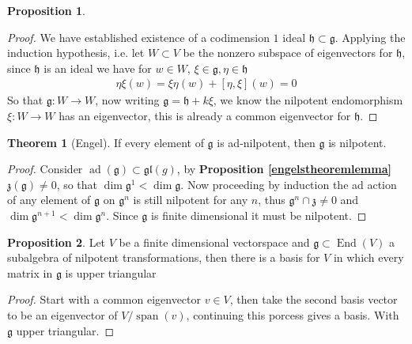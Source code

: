 \documentclass[10.5pt]{article}
\theoremstyle{definition}
\newtheorem{proposition}{Proposition}
\newtheorem{theorem}{Theorem}
\numberwithin{example}{subsection}
\numberwithin{proposition}{subsection}
\numberwithin{pb}{subsection}
\begin{document}
\begin{proposition}
\begin{proof}
                We have established existence of a codimension \(1\) ideal \(\mathfrak{h} \subset \mathfrak{g}\). Applying the induction hypothesis, i.e. let \(W \subset V\) be the nonzero subspace of eigenvectors for \(\mathfrak{h}\), since \(\mathfrak{h}\) is an ideal we have for \(w \in W\), \(\xi \in \mathfrak{g}, \eta \in \mathfrak{h}\)
                \begin{align}
                    \eta\xi(w) = \xi \eta (w) + [\eta,\xi](w) = 0
                \end{align}
                So that \(\mathfrak{g}: W \to W\), now writing \(\mathfrak{g} = \mathfrak{h} + k\xi\), we know the nilpotent endomorphism \(\xi: W \to W\) has an eigenvector,  this is already a common eigenvector for \(\mathfrak{h}\).
            \end{proof}
        \end{proposition}

        \begin{theorem}[Engel]\label{engel}
            If every element of \(\mathfrak{g}\) is ad-nilpotent, then \(\mathfrak{g}\) is nilpotent.

            \begin{proof}
                Consider \(\operatorname{ad}(\mathfrak{g}) \subset \mathfrak{gl}(g)\), by \textbf{Proposition \ref{engelstheoremlemma}} \(\mathfrak{z}(\mathfrak{g}) \neq 0\), so that \(\dim \mathfrak{g}^1 < \dim \mathfrak{g}\). Now proceeding by induction the ad action of any element of \(\mathfrak{g}\) on \(\mathfrak{g}^n\) is still nilpotent for any \(n\), thus \(\mathfrak{g}^n \cap \mathfrak{z} \neq 0\) and \(\dim \mathfrak{g}^{n+1} < \dim \mathfrak{g}^n\). Since \(\mathfrak{g}\) is finite dimensional it must be nilpotent.
            \end{proof}
        \end{theorem}
        \begin{proposition}\label{corengel}
            Let \(V\) be a finite dimensional vectorspace and \(\mathfrak{g} \subset \operatorname{End}(V)\) a subalgebra of nilpotent transformations, then there is a basis for \(V\) in which every matrix in \(\mathfrak{g}\) is upper triangular

            \begin{proof}
                 Start with a common eigenvector \(v \in V\), then take the second basis vector to be an eigenvector of \(V/\operatorname{span}(v)\), continuing this porcess gives a basis. With \(\mathfrak{g}\) upper triangular.
            \end{proof}
        \end{proposition}
\end{document}
